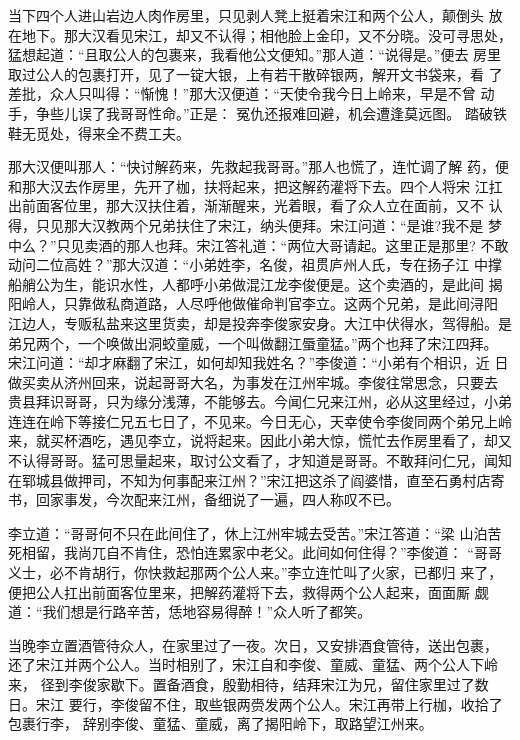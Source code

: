 当下四个人进山岩边人肉作房里，只见剥人凳上挺着宋江和两个公人，颠倒头
放在地下。那大汉看见宋江，却又不认得；相他脸上金印，又不分晓。没可寻思处，
猛想起道：“且取公人的包裹来，我看他公文便知。”那人道：“说得是。”便去
房里取过公人的包裹打开，见了一锭大银，上有若干散碎银两，解开文书袋来，看
了差批，众人只叫得：“惭愧！”那大汉便道：“天使令我今日上岭来，早是不曾
动手，争些儿误了我哥哥性命。”正是：
冤仇还报难回避，机会遭逢莫远图。
踏破铁鞋无觅处，得来全不费工夫。

那大汉便叫那人：“快讨解药来，先救起我哥哥。”那人也慌了，连忙调了解
药，便和那大汉去作房里，先开了枷，扶将起来，把这解药灌将下去。四个人将宋
江扛出前面客位里，那大汉扶住着，渐渐醒来，光着眼，看了众人立在面前，又不
认得，只见那大汉教两个兄弟扶住了宋江，纳头便拜。宋江问道：“是谁?我不是
梦中么？”只见卖酒的那人也拜。宋江答礼道：“两位大哥请起。这里正是那里?
不敢动问二位高姓？”那大汉道：“小弟姓李，名俊，祖贯庐州人氏，专在扬子江
中撑船艄公为生，能识水性，人都呼小弟做混江龙李俊便是。这个卖酒的，是此间
揭阳岭人，只靠做私商道路，人尽呼他做催命判官李立。这两个兄弟，是此间浔阳
江边人，专贩私盐来这里货卖，却是投奔李俊家安身。大江中伏得水，驾得船。是
弟兄两个，一个唤做出洞蛟童威，一个叫做翻江蜃童猛。”两个也拜了宋江四拜。
宋江问道：“却才麻翻了宋江，如何却知我姓名？”李俊道：“小弟有个相识，近
日做买卖从济州回来，说起哥哥大名，为事发在江州牢城。李俊往常思念，只要去
贵县拜识哥哥，只为缘分浅薄，不能够去。今闻仁兄来江州，必从这里经过，小弟
连连在岭下等接仁兄五七日了，不见来。今日无心，天幸使令李俊同两个弟兄上岭
来，就买杯酒吃，遇见李立，说将起来。因此小弟大惊，慌忙去作房里看了，却又
不认得哥哥。猛可思量起来，取讨公文看了，才知道是哥哥。不敢拜问仁兄，闻知
在郓城县做押司，不知为何事配来江州？”宋江把这杀了阎婆惜，直至石勇村店寄
书，回家事发，今次配来江州，备细说了一遍，四人称叹不已。

李立道：“哥哥何不只在此间住了，休上江州牢城去受苦。”宋江答道：“梁
山泊苦死相留，我尚兀自不肯住，恐怕连累家中老父。此间如何住得？”李俊道：
“哥哥义士，必不肯胡行，你快救起那两个公人来。”李立连忙叫了火家，已都归
来了，便把公人扛出前面客位里来，把解药灌将下去，救得两个公人起来，面面厮
觑道：“我们想是行路辛苦，恁地容易得醉！”众人听了都笑。

当晚李立置酒管待众人，在家里过了一夜。次日，又安排酒食管待，送出包裹，
还了宋江并两个公人。当时相别了，宋江自和李俊、童威、童猛、两个公人下岭来，
径到李俊家歇下。置备酒食，殷勤相待，结拜宋江为兄，留住家里过了数日。宋江
要行，李俊留不住，取些银两赍发两个公人。宋江再带上行枷，收拾了包裹行李，
辞别李俊、童猛、童威，离了揭阳岭下，取路望江州来。

